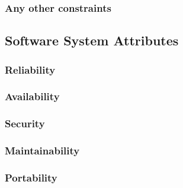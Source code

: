 \subsubsection{Any other constraints}
\subsection{Software System Attributes}
\subsubsection{Reliability}
\subsubsection{Availability}
\subsubsection{Security}
\subsubsection{Maintainability}
\subsubsection{Portability}